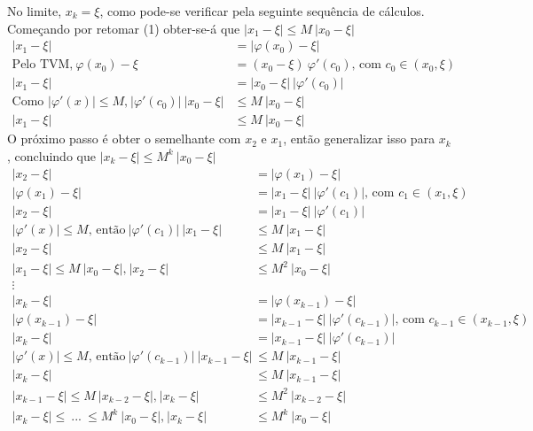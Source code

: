No limite, $x_k = \xi$, como pode-se verificar pela seguinte sequência de cálculos. Começando por retomar (1) obter-se-á que $|x_1 - \xi| \leq M \ |x_0 - \xi|$
\begin{align*}
    |x_1 - \xi| &= |\varphi(x_0) - \xi| \\
    \text{Pelo TVM,} \ \varphi(x_0) - \xi &= (x_0 - \xi) \ \varphi'(c_0) \text{, com $c_0 \in (x_0, \xi)$} \\
    |x_1 - \xi| &= |x_0 - \xi| \ |\varphi'(c_0)| \\
    \text{Como $|\varphi'(x)| \leq M$,} \ |\varphi'(c_0)| \ |x_0 - \xi| &\leq M \ |x_0 - \xi| \\
    |x_1 - \xi| &\leq M \ |x_0 - \xi|
\end{align*}
O próximo passo é obter o semelhante com $x_2$ e $x_1$, então generalizar isso para $x_k$, concluindo que $|x_k - \xi| \leq M^k \ |x_0 - \xi|$
\begin{align*}
    |x_2 - \xi| &= |\varphi(x_1) - \xi| \\
    |\varphi(x_1) - \xi| &= |x_1 - \xi| \ |\varphi'(c_1)| \text{, com $c_1 \in (x_1, \xi)$} \\
    |x_2 - \xi| &= |x_1 - \xi| \ |\varphi'(c_1)| \\
    \text{$|\varphi'(x)| \leq M$, então} \ |\varphi'(c_1)| \ |x_1 - \xi| &\leq M \ |x_1 - \xi| \\
    |x_2 - \xi| &\leq M \ |x_1 - \xi| \\
    \text{$|x_1 - \xi| \leq M \ |x_0 - \xi|$,} \ |x_2 - \xi| &\leq M^2 \ |x_0 - \xi| \\ %
    \vdots \\
    |x_k - \xi| &= |\varphi(x_{k-1}) - \xi| \\
    |\varphi(x_{k-1}) - \xi| &= |x_{k-1} - \xi| \ |\varphi'(c_{k-1})| \text{, com $c_{k-1} \in (x_{k-1}, \xi)$} \\
    |x_k - \xi| &= |x_{k-1} - \xi| \ |\varphi'(c_{k-1})| \\
    \text{$|\varphi'(x)| \leq M$, então} \ |\varphi'(c_{k-1})| \ |x_{k-1} - \xi| &\leq M \ |x_{k-1} - \xi|\\
    |x_k - \xi| &\leq M \ |x_{k-1} - \xi| \\
    \text{$|x_{k-1} - \xi| \leq M \ |x_{k-2} - \xi|$,} \ |x_k - \xi| &\leq M^2 \ |x_{k-2} - \xi| \\ 
    \text{$|x_k - \xi| \leq \ ... \ \leq M^k \ |x_0 - \xi|$,} \ |x_k - \xi| &\leq M^k \ |x_0 - \xi|
\end{align*}

